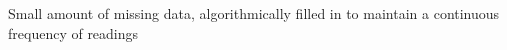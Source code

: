 
Small amount of missing data, algorithmically filled in to maintain a continuous frequency of readings
